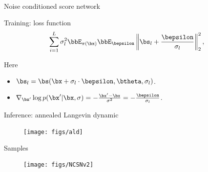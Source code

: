 \begin{frame}{Noise conditioned score network}
	
	\begin{minipage}{0.5\linewidth}
		\vspace{-0.7cm}
		\begin{block}{Training: loss function}
			\vspace{-0.8cm}
			\[
			\sum_{i=1}^L \sigma_l^2\bbE_{\pi(\bx)} \bbE_{\bepsilon}\left\| \bs_l + \frac{\bepsilon}{\sigma_l} \right\|^2_2,
			\]
		\end{block}
		\vspace{-0.5cm}
		Here
		\begin{itemize}
			\item $\bs_l = \bs(\bx + \sigma_l \cdot \bepsilon, \btheta, \sigma_l)$.
			\item $\nabla_{\bx'} \log p(\bx' | \bx, \sigma) = - \frac{\bx' - \bx}{\sigma^2} = - \frac{\bepsilon}{\sigma_l}$.
		\end{itemize}
	\end{minipage}%
	\begin{minipage}{0.5\linewidth}
		\begin{block}{Inference: annealed Langevin dynamic}
			\begin{figure}
				\texttt{[image: figs/ald]}
			\end{figure}
		\end{block}
	\end{minipage}
	\vspace{-0.7cm}
	\begin{block}{Samples}
		\begin{figure}
			\texttt{[image: figs/NCSNv2]}
		\end{figure}
	\end{block}
\end{frame}
